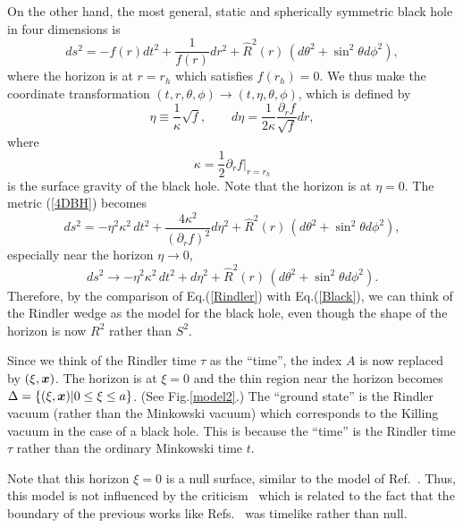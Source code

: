 On the other hand,
the most general, static and spherically symmetric black hole
in four dimensions is
\begin{equation}
ds^2=-f(r)dt^2+\frac{1}{f(r)}dr^2+
\hat{R}^2(r)\,(d\theta^2+\sin^2\theta d\phi^2),
\label{4DBH}
\end{equation}
where the horizon is at $r=r_h$ which satisfies $f(r_h)=0$.
We thus make the coordinate transformation
$(t,r,\theta,\phi)\to(t,\eta,\theta,\phi)$,
which is defined by
\begin{equation}
\eta\equiv\frac{1}{\kappa}\sqrt{f},\qquad
    d\eta=\frac{1}{2\kappa}\frac{\partial_r f}{\sqrt{f}} dr,
\end{equation}
where 
\begin{equation}
\kappa=\frac{1}{2}\partial_r f|_{r=r_h}
\end{equation}
is the surface gravity of the black hole.
Note that the horizon is at $\eta=0$.
The metric (\ref{4DBH}) becomes
\begin{equation}
 ds^2=-\eta^2\kappa^2\, dt^2+\frac{4\kappa^2}{(\partial_r f)^2}d\eta^2
   +\hat{R}^2(r)\,(d\theta^2+\sin^2\theta d\phi^2),
\end{equation}
especially near the horizon $\eta\to0$,
\begin{equation}
 ds^2\to-\eta^2\kappa^2\, dt^2+d\eta^2
   +\hat{R}^2(r)\,(d\theta^2+\sin^2\theta d\phi^2).
\label{Black}
\end{equation}
Therefore, by the comparison of Eq.(\ref{Rindler})
with Eq.(\ref{Black}),
we can think of the Rindler wedge as the model for
the black hole, even though the shape of the horizon
is now $R^2$ rather than $S^2$.

Since we think of the Rindler time $\tau$ as the ``time'',
the index $A$ is now replaced by $(\xi,\mbox{\boldmath $x$})$.
The horizon is at $\xi=0$ and 
the thin region near the horizon becomes
$\Delta=\{(\xi,\mbox{\boldmath $x$}) | 0\le \xi \le a \}$.
(See Fig.\ref{model2}.)
The ``ground state'' is the Rindler vacuum
(rather than the Minkowski vacuum)
which corresponds to the Killing vacuum
in the case of a black hole.
This is because the ``time'' is the Rindler time $\tau$
rather than the ordinary Minkowski time $t$.

Note that this horizon $\xi=0$ is a null surface,
similar to the model of Ref.~\cite{MuSeKo98}.
Thus, this model is not influenced by
the criticism~\cite{FroNov93} which is related
to the fact that the boundary of
the previous works like Refs.~\cite{BKLS86,Sredni93}
was timelike rather than null.

